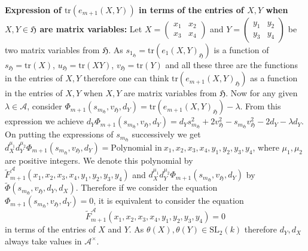 \documentclass[10pt,twoside]{amsart}
\newcommand{\SL}{\mathrm{SL}}
\newcommand{\tr}{\mathrm{tr}}
\theoremstyle{definition}
\theoremstyle{definition}
\begin{document}
\noindent\textbf{Expression of $\tr(e_{m+1}(X,Y))$ in terms of the entries of $X,Y$ when $X,Y\in \mathfrak{H}$ are matrix variables:} Let $X=\left (\begin{array}{cc}
     x_1& x_2 \\
     x_3&x_4 
\end{array}\right )$ and $Y=\left (\begin{array}{cc}
     y_1&y_2  \\
     y_3&y_4 
\end{array}\right )$ be two matrix variables from $\mathfrak{H}$. As $s_{1_{\mathfrak{H}}}=\tr(e_1(X,Y)_{\mathfrak{H}})$ is a function of $s_{\mathfrak{H}}=\tr(X)$, $u_{\mathfrak{H}}=\tr(XY)$, $v_{\mathfrak{H}}=\tr(Y)$ and all these three are the functions in the entries of $X,Y$ therefore one can think $\tr(e_{m+1}(X,Y)_{\mathfrak{H}})$ as a function in the entries of $X,Y$ when $X,Y$ are matrix variables from $\mathfrak{H}$. Now for any given $\lambda\in \mathcal{A}$, consider  $\Phi_{m+1}(s_{m_{\mathfrak{H}}},v_{\mathfrak{H}}, d_{Y})=\tr(e_{m+1}(X,Y)_{\mathfrak{H}})-\lambda$. From this expression we achieve $d_Y\Phi_{m+1}(s_{m_{\mathfrak{H}}},v_{\mathfrak{H}}, d_{Y})=d_Ys_{m_{\mathfrak{H}}}^2+2v_{\mathfrak{H}}^2-s_{m_{\mathfrak{H}}}v_{\mathfrak{H}}^2-2d_Y-\lambda d_Y$. On putting the expressions of $s_{m_{\mathfrak{H}}}$ successively we get $d_X^{\mu_1} d_Y^{\mu_2}\Phi_{m+1}(s_{m_{\mathfrak{H}}},v_{\mathfrak{H}}, d_{Y})=\text{Polynomial in}\ x_1,x_2,x_3,x_4,y_1,y_2,y_3,y_4$, where $\mu_1,\mu_2$ are positive integers. We denote this polynomial by $\widetilde F_{m+1}^{\mathcal{A}}(x_1,x_2,x_3,x_4,y_1,y_2,y_3,y_4)$ and $d_X^{\mu_1} d_Y^{\mu_2}\Phi_{m+1}(s_{m_{\mathfrak{H}}},v_{\mathfrak{H}}, d_{Y})$ by $\widetilde \Phi(s_{m_{\mathfrak{H}}},v_{\mathfrak{H}}, d_{Y},d_X)$. Therefore if we consider the equation $\Phi_{m+1}(s_{m_{\mathfrak{H}}},v_{\mathfrak{H}}, d_{Y})=0$, it is equivalent to consider the equation $$\widetilde F_{m+1}^{\mathcal{A}}(x_1,x_2,x_3,x_4,y_1,y_2,y_3,y_4)=0$$ in terms of the entries of $X$ and $Y$. As $\theta (X),\theta(Y)\in \SL_2(k)$ therefore $d_Y,d_X$  always take values in $\mathcal{A}^{\times}$.
\fi
\end{document}
